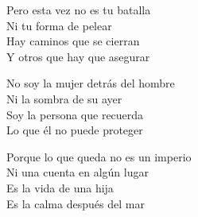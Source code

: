 \begin{lyrics}
Pero esta vez no es tu batalla\\
Ni tu forma de pelear\\
Hay caminos que se cierran\\
Y otros que hay que asegurar


No soy la mujer detrás del hombre\\
Ni la sombra de su ayer\\
Soy la persona que recuerda\\
Lo que él no puede proteger


Porque lo que queda no es un imperio\\
Ni una cuenta en algún lugar\\
Es la vida de una hija\\
Es la calma después del mar
\end{lyrics}

